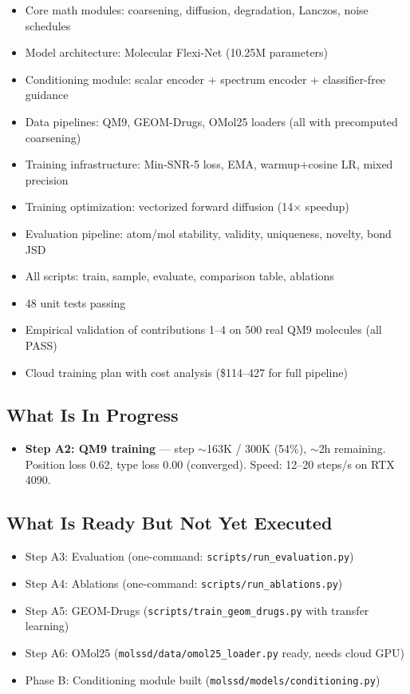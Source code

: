 \documentclass[12pt,a4paper]{article}
\begin{document}
\begin{itemize}[nosep]
    \item[\checkmark] Core math modules: coarsening, diffusion, degradation, Lanczos, noise schedules
    \item[\checkmark] Model architecture: Molecular Flexi-Net (10.25M parameters)
    \item[\checkmark] Conditioning module: scalar encoder + spectrum encoder + classifier-free guidance
    \item[\checkmark] Data pipelines: QM9, GEOM-Drugs, OMol25 loaders (all with precomputed coarsening)
    \item[\checkmark] Training infrastructure: Min-SNR-5 loss, EMA, warmup+cosine LR, mixed precision
    \item[\checkmark] Training optimization: vectorized forward diffusion (14$\times$ speedup)
    \item[\checkmark] Evaluation pipeline: atom/mol stability, validity, uniqueness, novelty, bond JSD
    \item[\checkmark] All scripts: train, sample, evaluate, comparison table, ablations
    \item[\checkmark] 48 unit tests passing
    \item[\checkmark] Empirical validation of contributions 1--4 on 500 real QM9 molecules (all PASS)
    \item[\checkmark] Cloud training plan with cost analysis (\$114--427 for full pipeline)
\end{itemize}

\subsection{What Is In Progress}

\begin{itemize}[nosep]
    \item[$\circlearrowright$] \textbf{Step A2: QM9 training} --- step $\sim$163K / 300K (54\%), $\sim$2h remaining.
    Position loss 0.62, type loss 0.00 (converged). Speed: 12--20 steps/s on RTX 4090.
\end{itemize}

\subsection{What Is Ready But Not Yet Executed}

\begin{itemize}[nosep]
    \item[\textbullet] Step A3: Evaluation (one-command: \texttt{scripts/run\_evaluation.py})
    \item[\textbullet] Step A4: Ablations (one-command: \texttt{scripts/run\_ablations.py})
    \item[\textbullet] Step A5: GEOM-Drugs (\texttt{scripts/train\_geom\_drugs.py} with transfer learning)
    \item[\textbullet] Step A6: OMol25 (\texttt{molssd/data/omol25\_loader.py} ready, needs cloud GPU)
    \item[\textbullet] Phase B: Conditioning module built (\texttt{molssd/models/conditioning.py})
\end{itemize}
\end{document}
